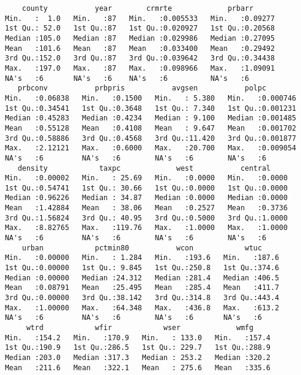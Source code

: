 \documentclass[11pt]{article}
\begin{document}
    
    \begin{verbatim}
     county           year        crmrte             prbarr       
 Min.   :  1.0   Min.   :87   Min.   :0.005533   Min.   :0.09277  
 1st Qu.: 52.0   1st Qu.:87   1st Qu.:0.020927   1st Qu.:0.20568  
 Median :105.0   Median :87   Median :0.029986   Median :0.27095  
 Mean   :101.6   Mean   :87   Mean   :0.033400   Mean   :0.29492  
 3rd Qu.:152.0   3rd Qu.:87   3rd Qu.:0.039642   3rd Qu.:0.34438  
 Max.   :197.0   Max.   :87   Max.   :0.098966   Max.   :1.09091  
 NA's   :6       NA's   :6    NA's   :6          NA's   :6        
    prbconv           prbpris           avgsen           polpc         
 Min.   :0.06838   Min.   :0.1500   Min.   : 5.380   Min.   :0.000746  
 1st Qu.:0.34541   1st Qu.:0.3648   1st Qu.: 7.340   1st Qu.:0.001231  
 Median :0.45283   Median :0.4234   Median : 9.100   Median :0.001485  
 Mean   :0.55128   Mean   :0.4108   Mean   : 9.647   Mean   :0.001702  
 3rd Qu.:0.58886   3rd Qu.:0.4568   3rd Qu.:11.420   3rd Qu.:0.001877  
 Max.   :2.12121   Max.   :0.6000   Max.   :20.700   Max.   :0.009054  
 NA's   :6         NA's   :6        NA's   :6        NA's   :6         
    density            taxpc             west           central      
 Min.   :0.00002   Min.   : 25.69   Min.   :0.0000   Min.   :0.0000  
 1st Qu.:0.54741   1st Qu.: 30.66   1st Qu.:0.0000   1st Qu.:0.0000  
 Median :0.96226   Median : 34.87   Median :0.0000   Median :0.0000  
 Mean   :1.42884   Mean   : 38.06   Mean   :0.2527   Mean   :0.3736  
 3rd Qu.:1.56824   3rd Qu.: 40.95   3rd Qu.:0.5000   3rd Qu.:1.0000  
 Max.   :8.82765   Max.   :119.76   Max.   :1.0000   Max.   :1.0000  
 NA's   :6         NA's   :6        NA's   :6        NA's   :6       
     urban            pctmin80           wcon            wtuc      
 Min.   :0.00000   Min.   : 1.284   Min.   :193.6   Min.   :187.6  
 1st Qu.:0.00000   1st Qu.: 9.845   1st Qu.:250.8   1st Qu.:374.6  
 Median :0.00000   Median :24.312   Median :281.4   Median :406.5  
 Mean   :0.08791   Mean   :25.495   Mean   :285.4   Mean   :411.7  
 3rd Qu.:0.00000   3rd Qu.:38.142   3rd Qu.:314.8   3rd Qu.:443.4  
 Max.   :1.00000   Max.   :64.348   Max.   :436.8   Max.   :613.2  
 NA's   :6         NA's   :6        NA's   :6       NA's   :6      
      wtrd            wfir            wser             wmfg      
 Min.   :154.2   Min.   :170.9   Min.   : 133.0   Min.   :157.4  
 1st Qu.:190.9   1st Qu.:286.5   1st Qu.: 229.7   1st Qu.:288.9  
 Median :203.0   Median :317.3   Median : 253.2   Median :320.2  
 Mean   :211.6   Mean   :322.1   Mean   : 275.6   Mean   :335.6  

\end{verbatim}
\end{document}
